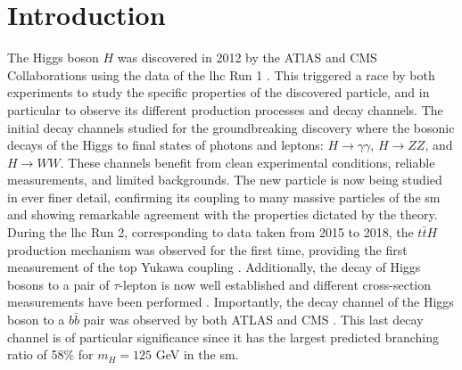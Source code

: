 \section{Introduction}
The Higgs boson $H$ \cite{Englert:1964et, PhysRevLett.13.508, Higgs:1964ia, PhysRevLett.13.585} was discovered in 2012 by the ATlAS and CMS Collaborations using the data of the \gls{lhc} Run 1 \cite{ATLAS:2012yve, CMS:2012qbp}. This triggered a race by both experiments to study the specific properties of the discovered particle, and in particular to observe its different production processes and decay channels. The initial decay channels studied for the groundbreaking discovery where the bosonic decays of the Higgs to final states of photons and leptons: $H \rightarrow \gamma\gamma$, $H \rightarrow ZZ$, and $H \rightarrow WW$. These channels benefit from clean experimental conditions, reliable measurements, and limited backgrounds. The new particle is now being studied in ever finer detail, confirming its coupling to many massive particles of the \gls{sm} and showing remarkable agreement with the properties dictated by the theory. During the \gls{lhc} Run 2, corresponding to data taken from 2015 to 2018, the $t\bar{t}H$ production mechanism was observed for the first time, providing the first measurement of the top Yukawa coupling \cite{ATLAS:2018mme, CMS:2018uxb}. Additionally, the decay of Higgs bosons to a pair of $\tau$-lepton is now well established and different cross-section measurements have been performed \cite{atlasTauMeasu, CMS:2021gxc}. Importantly, the decay channel of the Higgs boson to a $b\bar{b}$ pair was observed by both ATLAS and CMS \cite{ATLAS:2018kot, CMS:2018nsn}. This last decay channel is of particular significance since it has the largest predicted branching ratio of 58\% for $m_H = 125$ GeV in the \gls{sm}. \\ 


